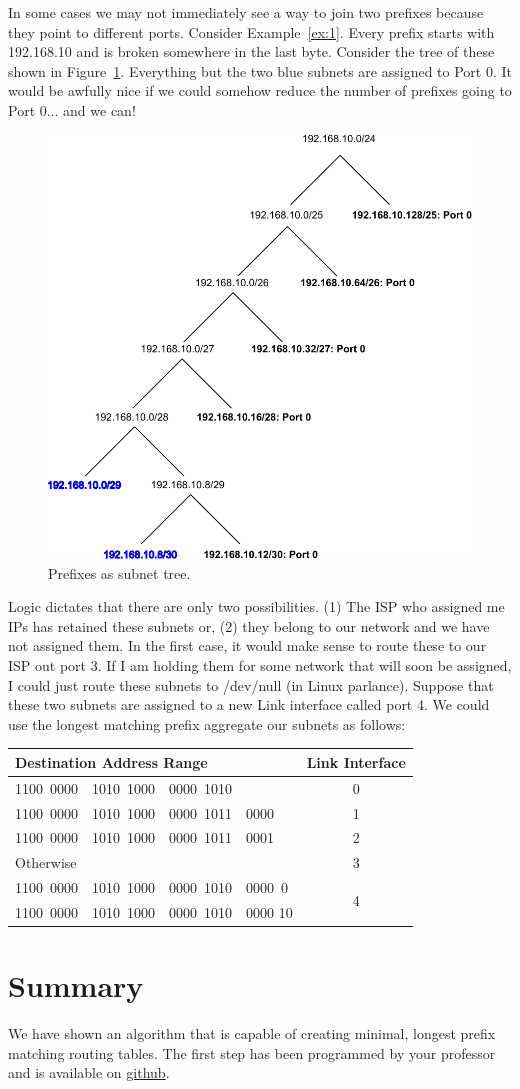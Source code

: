 \documentclass[pdf,bookmarks,colorlinks=true]{article}
\theoremstyle{definition}
\begin{document}
In some cases we may not immediately see a way to join two prefixes because they point to different ports. Consider Example~\ref{ex:1}. Every prefix starts with 192.168.10 and is broken somewhere in the last byte. Consider the tree of these shown in Figure~\ref{fig:prefix_tree}. Everything but the two blue subnets are assigned to Port 0. It would be awfully nice if we could somehow reduce the number of prefixes going to Port 0... and we can! 
\begin{figure}[ht]
	\centering
	\includegraphics[width=0.6\linewidth]{example1_tree.pdf}
	\caption{Prefixes as subnet tree.}
	\label{fig:prefix_tree}
\end{figure}

Logic dictates that there are only two possibilities. (1) The ISP who assigned me IPs has retained these subnets or, (2) they belong to our network and we have not assigned them. In the first case, it would make sense to route these to our ISP out port 3. If I am holding them for some network that will soon be assigned, I could just route these subnets to /dev/null (in Linux parlance). Suppose that these two subnets are assigned to a new Link interface called port 4. We could use the longest matching prefix aggregate our subnets as follows:

\begin{center}
	\begin{tabular}{|l|c|}\hline
		Destination Address Range &  Link Interface \\ \hline
		1100~0000~~1010~1000~~0000~1010 & 0 \\ \hline
		1100~0000~~1010~1000~~0000~1011~~0000 & 1\\ \hline
		1100~0000~~1010~1000~~0000~1011~~0001 & 2\\ \hline 
		Otherwise & 3 \\ \hline
		1100~0000~~1010~1000~~0000~1010~~0000~0 & \multirow{2}{*}{4} \\
		1100~0000~~1010~1000~~0000~1010~~0000 10 & \\ \hline
	\end{tabular}\bigskip
\end{center}

\section{Summary}

We have shown an algorithm that is capable of creating minimal, longest prefix matching routing tables. The first step has been programmed by your professor and is available on \href{https://github.com/scotpatti/Range2LongestPrefix}{github}.
\end{document}
